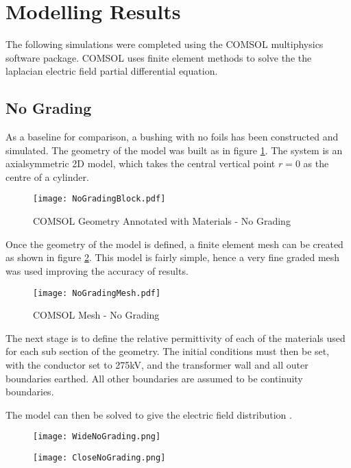 \section{Modelling Results}
The following simulations were completed using the COMSOL multiphysics software package.
COMSOL uses finite element methods to solve the the laplacian electric field partial differential equation.

\subsection{No Grading}
As a baseline for comparison, a bushing with no foils has been constructed and simulated.
The geometry of the model was built as in figure \ref{figure:Geom:Nograde}.
The system is an axialsymmetric 2D model, which takes the central vertical point $r=0$ as the centre of a cylinder.
\begin{figure}[!h]
   \centering
   \texttt{[image: NoGradingBlock.pdf]}
   \caption{COMSOL Geometry Annotated with Materials - No Grading}
   \label{figure:Geom:Nograde}
\end{figure}

Once the geometry of the model is defined, a finite element mesh can be created as shown in figure \ref{figure:Mesh:Nograde}.
This model is fairly simple, hence a very fine graded mesh was used improving the accuracy of results.
\begin{figure}[!h]
   \centering
   \texttt{[image: NoGradingMesh.pdf]}
   \caption{COMSOL Mesh - No Grading}
   \label{figure:Mesh:Nograde}
\end{figure}

The next stage is to define the relative permittivity of each of the materials used for each sub section of the geometry.
The initial conditions must then be set, with the conductor set to 275kV, and the transformer wall and all outer boundaries earthed.
All other boundaries are assumed to be continuity boundaries.

The model can then be solved to give the electric field distribution
.
\begin{figure}[!h]
   \centering
   \texttt{[image: WideNoGrading.png]}
\end{figure}

\begin{figure}[!h]
   \centering
   \texttt{[image: CloseNoGrading.png]}
\end{figure}

